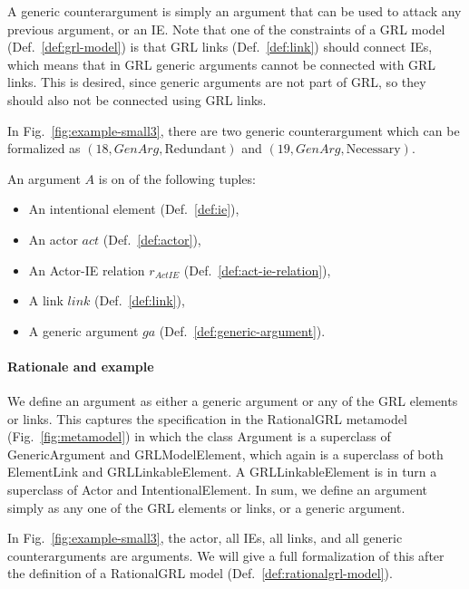A generic counterargument is simply an argument that can be used to attack any previous argument, or an IE. Note that one of the constraints of a GRL model (Def.~\ref{def:grl-model}) is that GRL links (Def.~\ref{def:link}) should connect IEs, which means that in GRL generic arguments cannot be connected with GRL links. This is desired, since generic arguments are not part of GRL, so they should also not be connected using GRL links. 

In Fig.~\ref{fig:example-small3}, there are two generic counterargument which can be formalized as $(18,GenArg, \text{Redundant})$ and $(19, GenArg, \text{Necessary})$.

\begin{definition}[Argument]
\label{def:argument}
An argument $A$ is on of the following tuples:
\begin{itemize}
\item An intentional element (Def.~\ref{def:ie}), 
\item An actor $act$ (Def.~\ref{def:actor}),
\item An Actor-IE relation $r_{ActIE}$ (Def.~\ref{def:act-ie-relation}), 
\item A link $link$ (Def.~\ref{def:link}),
\item A generic argument $ga$ (Def.~\ref{def:generic-argument}).
\end{itemize}
\end{definition}

\paragraph{Rationale and example} We define an argument as either a generic argument or any of the GRL elements or links. This captures the specification in the RationalGRL metamodel (Fig.~\ref{fig:metamodel}) in which the class \textsf{Argument} is a superclass of \textsf{GenericArgument} and \textsf{GRLModelElement}, which again is a superclass of both \textsf{ElementLink} and \textsf{GRLLinkableElement}. A \textsf{GRLLinkableElement} is in turn a superclass of \textsf{Actor} and \textsf{IntentionalElement}. In sum, we define an argument simply as any one of the GRL elements or links, or a generic argument.

In Fig.~\ref{fig:example-small3}, the actor, all IEs, all links, and all generic counterarguments are arguments. We will give a full formalization of this after the definition of a RationalGRL model (Def.~\ref{def:rationalgrl-model}).

